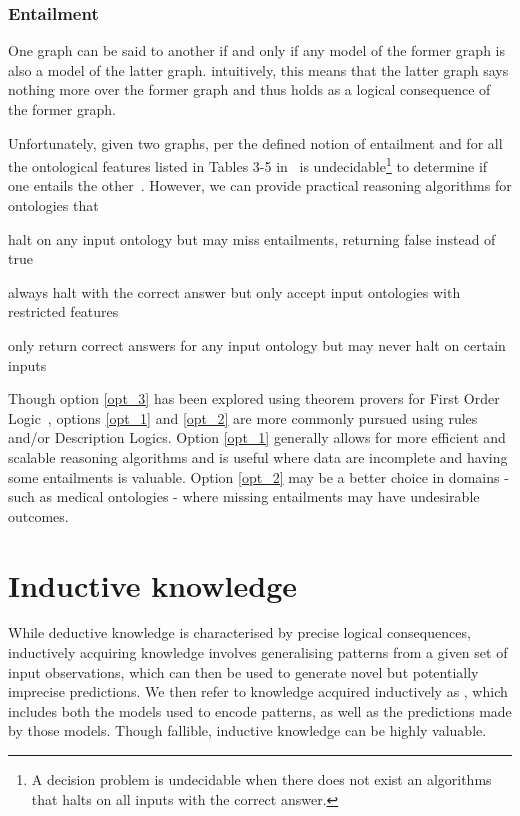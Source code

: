 \subsubsection{Entailment}
One graph can be said to  another if and only if any model of the former graph is also a model of the latter graph. intuitively, this means that the latter graph says nothing more over the former graph and thus holds as a logical consequence of the former graph. 

Unfortunately, given two graphs, per the defined notion of entailment and for all the ontological features listed in Tables 3-5 in~\cite{Hogan2021KGs} is undecidable\footnote{A decision problem is undecidable when there does not exist an algorithms that halts on all inputs with the correct answer.} to determine if one entails the other~\cite{Hitzler2010FoundationsSWTechnologies}. However, we can provide practical reasoning algorithms for ontologies that 

\begin{enumerate*}[label=(\roman*),before=\unskip{ i.e., }, itemjoin={{, }}, itemjoin*={{, or }}]
    \item\label{opt_1} halt on any input ontology but may miss entailments, returning false instead of true 
    \item\label{opt_2} always halt with the correct answer but only accept input ontologies with restricted features 
    \item\label{opt_3} only return     correct answers for any input ontology but may never halt on certain inputs 
    \end{enumerate*}

Though option \ref{opt_3} has been explored using theorem provers for First Order Logic~\cite{Schneider2011ReasoningOWL2Full}, options \ref{opt_1} and \ref{opt_2} are more commonly pursued using rules and/or Description Logics. Option \ref{opt_1} generally allows for more efficient and scalable reasoning algorithms and is useful where data are incomplete and having some entailments is valuable. Option \ref{opt_2} may be a better choice in domains - such as medical ontologies - where missing entailments may have undesirable outcomes.

\section{Inductive knowledge}
While deductive knowledge is characterised by precise logical consequences, inductively acquiring knowledge involves generalising patterns from a given set of input observations, which can then be used to generate novel but potentially imprecise predictions. We then refer to knowledge acquired inductively as , which includes both the models used to encode patterns, as well as the predictions made by those models. Though fallible, inductive knowledge can be highly valuable.  

